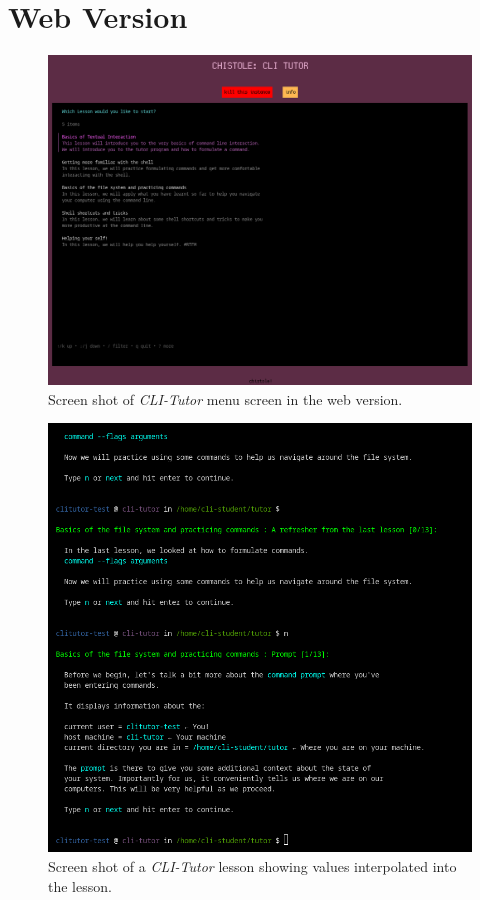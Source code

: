 \section{Web Version}

\begin{figure}[htbp]
	\centering
	\includegraphics[width=1\textwidth]{img/cliwebfull}
	\caption{Screen shot of \textit{CLI-Tutor} menu screen in the web version.}
	\label{fig:webversion}
\end{figure}

\begin{figure}[htbp]
	\centering
	\includegraphics[width=1\textwidth]{img/cliexpansionfull}
	\caption{Screen shot of a \textit{CLI-Tutor} lesson showing values interpolated into the lesson.}
	\label{fig:webversion}
\end{figure}


